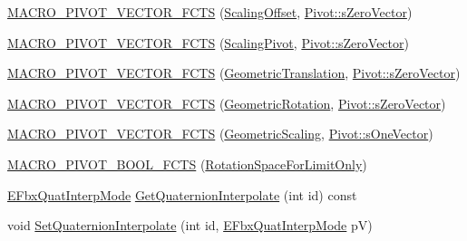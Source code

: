 \begin{DoxyCompactItemize}
\item 
\hyperlink{class_fbx_node_1_1_pivots_a0d481d3fbc32f2369fe3630c5a061cb5}{M\+A\+C\+R\+O\+\_\+\+P\+I\+V\+O\+T\+\_\+\+V\+E\+C\+T\+O\+R\+\_\+\+F\+C\+TS} (\hyperlink{class_fbx_node_a8f1fe91e72b9e34f981b153140cc35de}{Scaling\+Offset}, \hyperlink{class_fbx_node_1_1_pivot_a5bcef181b0b941f66222adb91896ff2c}{Pivot\+::s\+Zero\+Vector})
\item 
\hyperlink{class_fbx_node_1_1_pivots_aeffbc998a1f0f1d4e701f4ad1b09831e}{M\+A\+C\+R\+O\+\_\+\+P\+I\+V\+O\+T\+\_\+\+V\+E\+C\+T\+O\+R\+\_\+\+F\+C\+TS} (\hyperlink{class_fbx_node_ab7f341494efcbee371d417a9bf19d040}{Scaling\+Pivot}, \hyperlink{class_fbx_node_1_1_pivot_a5bcef181b0b941f66222adb91896ff2c}{Pivot\+::s\+Zero\+Vector})
\item 
\hyperlink{class_fbx_node_1_1_pivots_aff86702aee4902858423212d4d3fee5c}{M\+A\+C\+R\+O\+\_\+\+P\+I\+V\+O\+T\+\_\+\+V\+E\+C\+T\+O\+R\+\_\+\+F\+C\+TS} (\hyperlink{class_fbx_node_a34e3c56f86ea2484d512bfbaf2958bb6}{Geometric\+Translation}, \hyperlink{class_fbx_node_1_1_pivot_a5bcef181b0b941f66222adb91896ff2c}{Pivot\+::s\+Zero\+Vector})
\item 
\hyperlink{class_fbx_node_1_1_pivots_ae5c4a46e7a6f0d9ea90a4f781770e548}{M\+A\+C\+R\+O\+\_\+\+P\+I\+V\+O\+T\+\_\+\+V\+E\+C\+T\+O\+R\+\_\+\+F\+C\+TS} (\hyperlink{class_fbx_node_aa4c18688d7b0590c405af9198e27a678}{Geometric\+Rotation}, \hyperlink{class_fbx_node_1_1_pivot_a5bcef181b0b941f66222adb91896ff2c}{Pivot\+::s\+Zero\+Vector})
\item 
\hyperlink{class_fbx_node_1_1_pivots_a73f453d8347e4a1b5851d2be39ee1252}{M\+A\+C\+R\+O\+\_\+\+P\+I\+V\+O\+T\+\_\+\+V\+E\+C\+T\+O\+R\+\_\+\+F\+C\+TS} (\hyperlink{class_fbx_node_abc071af68acc0b2fa5fd98ce8d40471f}{Geometric\+Scaling}, \hyperlink{class_fbx_node_1_1_pivot_a885264a556ea04dc8baf96a0ef2067b1}{Pivot\+::s\+One\+Vector})
\item 
\hyperlink{class_fbx_node_1_1_pivots_afe85758bb7b5c4eec057a757a0459042}{M\+A\+C\+R\+O\+\_\+\+P\+I\+V\+O\+T\+\_\+\+B\+O\+O\+L\+\_\+\+F\+C\+TS} (\hyperlink{class_fbx_node_a7fe7f807388b6d974c612bbf432604e4}{Rotation\+Space\+For\+Limit\+Only})
\item 
\hyperlink{fbxmath_8h_a9c7a0dfb52c83256d4a92c5c6d1be72a}{E\+Fbx\+Quat\+Interp\+Mode} \hyperlink{class_fbx_node_1_1_pivots_acc6e16a61e8411938939ac3a4dde3f33}{Get\+Quaternion\+Interpolate} (int id) const
\item 
void \hyperlink{class_fbx_node_1_1_pivots_a8a9dcfd646b6aa80d02952f410140b66}{Set\+Quaternion\+Interpolate} (int id, \hyperlink{fbxmath_8h_a9c7a0dfb52c83256d4a92c5c6d1be72a}{E\+Fbx\+Quat\+Interp\+Mode} pV)

\end{DoxyCompactItemize}
